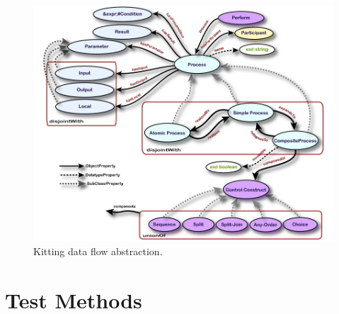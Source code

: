 
\begin{figure}[htb]
\includegraphics[width=16cm]{images/OWL-S.jpg}
\caption{Kitting data flow abstraction.}
\label{fig:ProcessDataFlow}
\end{figure}



\section{Test Methods}
\label{sect:TestMethods}


